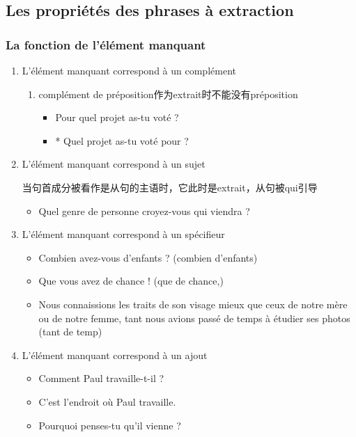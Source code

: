 \documentclass[UTF8]{report}
\begin{document}
\subsection{Les propriétés des phrases à extraction}

\subsubsection{La fonction de l’élément manquant}
\begin{enumerate}
    \item L’élément manquant correspond à un complément
    \begin{enumerate}
        \item complément de préposition作为extrait时不能没有préposition
        \begin{itemize}
            \item Pour quel projet as-tu voté ?
            \item * Quel projet as-tu voté pour ?
        \end{itemize}
    \end{enumerate}
    \item L’élément manquant correspond à un sujet
    
    当句首成分被看作是从句的主语时，它此时是extrait，从句被qui引导
    \begin{itemize}
        \item Quel genre de personne croyez-vous qui viendra ?
    \end{itemize}
    \item L’élément manquant correspond à un spécifieur
    \begin{itemize}
        \item Combien avez-vous d’enfants ? (combien d’enfants)
        \item Que vous avez de chance ! (que de chance,)
        \item Nous connaissions les traits de son visage mieux que ceux de notre mère ou de notre femme, tant nous avions passé de temps à étudier ses photos (tant de temp)
    \end{itemize}
    \item L’élément manquant correspond à un ajout
    \begin{itemize}
        \item Comment Paul travaille-t-il ?
        \item C’est l’endroit où Paul travaille.
        \item Pourquoi penses-tu qu’il vienne ?
    \end{itemize}
\end{enumerate}
\end{document}
